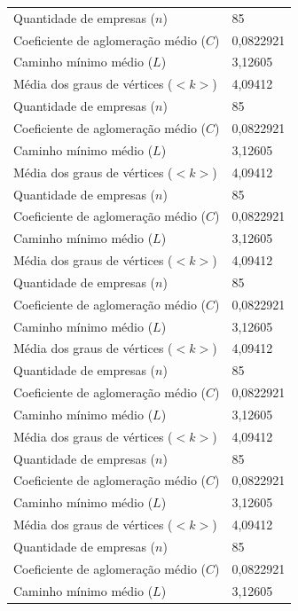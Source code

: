 \begin{longtable}{l|l}
Quantidade de empresas ($n$)                   & 85\\
Coeficiente de aglomera\c{c}\~ao m\'edio ($C$) & 0,0822921\\
Caminho m\'inimo m\'edio ($L$)                 & 3,12605\\
M\'edia dos graus de v\'ertices ($<k>$)        & 4,09412\\
Quantidade de empresas ($n$)                   & 85\\
Coeficiente de aglomera\c{c}\~ao m\'edio ($C$) & 0,0822921\\
Caminho m\'inimo m\'edio ($L$)                 & 3,12605\\
M\'edia dos graus de v\'ertices ($<k>$)        & 4,09412\\
Quantidade de empresas ($n$)                   & 85\\
Coeficiente de aglomera\c{c}\~ao m\'edio ($C$) & 0,0822921\\
Caminho m\'inimo m\'edio ($L$)                 & 3,12605\\
M\'edia dos graus de v\'ertices ($<k>$)        & 4,09412\\
Quantidade de empresas ($n$)                   & 85\\
Coeficiente de aglomera\c{c}\~ao m\'edio ($C$) & 0,0822921\\
Caminho m\'inimo m\'edio ($L$)                 & 3,12605\\
M\'edia dos graus de v\'ertices ($<k>$)        & 4,09412\\
Quantidade de empresas ($n$)                   & 85\\
Coeficiente de aglomera\c{c}\~ao m\'edio ($C$) & 0,0822921\\
Caminho m\'inimo m\'edio ($L$)                 & 3,12605\\
M\'edia dos graus de v\'ertices ($<k>$)        & 4,09412\\
Quantidade de empresas ($n$)                   & 85\\
Coeficiente de aglomera\c{c}\~ao m\'edio ($C$) & 0,0822921\\
Caminho m\'inimo m\'edio ($L$)                 & 3,12605\\
M\'edia dos graus de v\'ertices ($<k>$)        & 4,09412\\
Quantidade de empresas ($n$)                   & 85\\
Coeficiente de aglomera\c{c}\~ao m\'edio ($C$) & 0,0822921\\
Caminho m\'inimo m\'edio ($L$)                 & 3,12605\\

\end{longtable}
